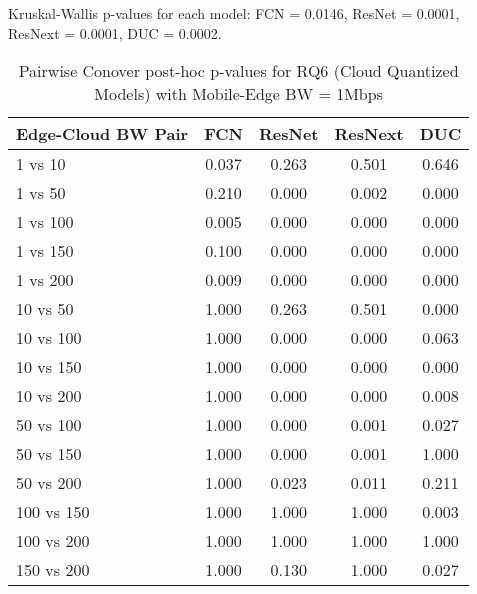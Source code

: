 \begin{table}[h]
\centering
\caption{Pairwise Conover post-hoc p-values for RQ6 (Cloud Quantized Models) with Mobile-Edge BW = 1Mbps}
\label{tab:conover_cloud_quantized_me1}
\smallskip
Kruskal-Wallis p-values for each model: FCN = 0.0146, ResNet = 0.0001, ResNext = 0.0001, DUC = 0.0002.

\begin{tabular}{lcccc}
\toprule
Edge-Cloud BW Pair & FCN & ResNet & ResNext & DUC \\
\midrule
1 vs 10 & 0.037 & 0.263 & 0.501 & 0.646 \\
1 vs 50 & 0.210 & 0.000 & 0.002 & 0.000 \\
1 vs 100 & 0.005 & 0.000 & 0.000 & 0.000 \\
1 vs 150 & 0.100 & 0.000 & 0.000 & 0.000 \\
1 vs 200 & 0.009 & 0.000 & 0.000 & 0.000 \\
10 vs 50 & 1.000 & 0.263 & 0.501 & 0.000 \\
10 vs 100 & 1.000 & 0.000 & 0.000 & 0.063 \\
10 vs 150 & 1.000 & 0.000 & 0.000 & 0.000 \\
10 vs 200 & 1.000 & 0.000 & 0.000 & 0.008 \\
50 vs 100 & 1.000 & 0.000 & 0.001 & 0.027 \\
50 vs 150 & 1.000 & 0.000 & 0.001 & 1.000 \\
50 vs 200 & 1.000 & 0.023 & 0.011 & 0.211 \\
100 vs 150 & 1.000 & 1.000 & 1.000 & 0.003 \\
100 vs 200 & 1.000 & 1.000 & 1.000 & 1.000 \\
150 vs 200 & 1.000 & 0.130 & 1.000 & 0.027 \\
\bottomrule
\end{tabular}
\end{table}

